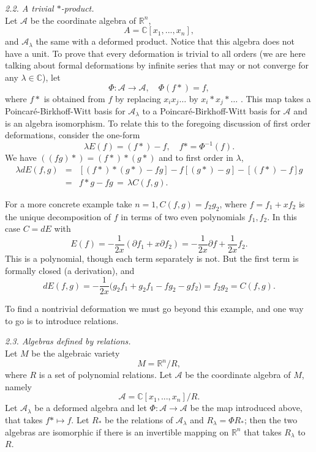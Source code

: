 \documentclass[a4paper,a4paper]{article}
\begin{document}
\noindent\textit{2.2. A trivial $*$-product.} \\
Let ${\mathcal{A}}$ be the coordinate algebra of $\mathbb{R}^n$,
$$
A =\mathbb{C}[x_1,...,x_n],
$$ 
 and
${\mathcal{A}}_\lambda$ the same with a deformed product.  Notice that
this algebra does not have a unit. To prove that every deformation
 is trivial to all orders  %
(we are here talking about formal deformations by infinite series that 
may or not converge for any $\lambda \in \mathbb{C}$), %
let  
$$
\Phi: {\mathcal{A}} \rightarrow {\mathcal{A}},\quad \Phi(f*) = f,
$$
where $f*$ is obtained from $f$ by replacing $x_ix_j\ldots$ by 
$x_i*x_j*\ldots\,\,$. This map takes a Poincar\'e-Birkhoff-Witt basis for
${\mathcal{A}_\lambda}$ to   a Poincar\'e-Birkhoff-Witt basis for
${\mathcal{A}}$ and is an algebra isomorphism.  To relate this to the
foregoing discussion of first order deformations, consider the one-form 
$$
\lambda E(f) = (f*)-f,\quad f* = \Phi^{-1}(f).
$$
  We have $((fg)*) = (f*)*(g*)$ and  to first order in $\lambda$,
\begin{eqnarray*}
\lambda dE(f,g) &=& [(f*)*(g*) - fg] - f[(g*)-g] - [(f*)-f]g \\
&=& f*g-fg \, = \, \lambda C(f,g).
\end{eqnarray*}

For a more concrete example take $n = 1, C(f,g) = f_2g_2$, where 
$f = f_1 + xf_2$ is the unique decomposition of $f$ in terms of two even
polynomials $f_1,f_2$. In this case $C = dE$ with
$$
E(f) = {-\frac{1}{2x}}(\partial f_1 + x\partial f_2) = 
{-\frac{1}{2x}}\partial f + {\frac{1}{2x}}f_2.
$$ 
This is  a polynomial,  though each term separately is not.   But the
first term is formally closed (a derivation), and
$$
dE(f,g)  = {-\frac{1}{2x}}\bigl(g_2f_1 + g_2f_1 - fg_2 - gf_2\bigr)
= f_2g_2  = C(f,g).
$$ 

To find a nontrivial deformation we must go beyond 
this example, and one way to go is to introduce relations.

\smallskip

\noindent\textit{2.3. Algebras defined by relations.}\\
Let $M$ be the algebraic variety
$$
M = \mathbb{R}^n/R,
$$
where $R$ is a set of polynomial relations. Let ${\mathcal{A}}$
be the coordinate algebra of $M$, namely
$$
{\mathcal{A}} = \mathbb{C}[x_1,...,x_n]/R.
$$ 
Let ${\mathcal{A}}_\lambda$ be a deformed algebra and let 
$\Phi: {\mathcal{A}}\rightarrow {\mathcal{A}}$ be the map introduced above,  
that takes $f*\mapsto f$. Let $R_* $ be the relations of 
${\mathcal{A}}_\lambda$ and $R_\lambda = \Phi R_*$; then the two algebras 
are isomorphic if there is an invertible mapping  on $\mathbb{R}^n$ that 
takes $R_\lambda$ to $R$.
\end{document}
